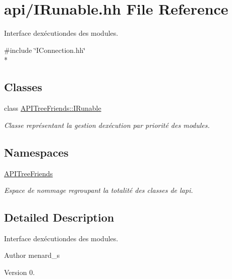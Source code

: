 \hypertarget{_i_runable_8hh}{}\section{api/\+I\+Runable.hh File Reference}
\label{_i_runable_8hh}


Interface d\textquotesingle{}exécutiondes des modules.  


{\ttfamily \#include \char`\"{}I\+Connection.\+hh\char`\"{}}\\*
\subsection*{Classes}
\begin{DoxyCompactItemize}
\item 
class \hyperlink{class_a_p_i_tree_friends_1_1_i_runable}{A\+P\+I\+Tree\+Friends\+::\+I\+Runable}
\begin{DoxyCompactList}\small\item\em Classe représentant la gestion d\textquotesingle{}exécution par priorité des modules. \end{DoxyCompactList}\end{DoxyCompactItemize}
\subsection*{Namespaces}
\begin{DoxyCompactItemize}
\item 
 \hyperlink{namespace_a_p_i_tree_friends}{A\+P\+I\+Tree\+Friends}
\begin{DoxyCompactList}\small\item\em Espace de nommage regroupant la totalité des classes de l\textquotesingle{}api. \end{DoxyCompactList}\end{DoxyCompactItemize}


\subsection{Detailed Description}
Interface d\textquotesingle{}exécutiondes des modules. 

\begin{DoxyAuthor}{Author}
menard\+\_\+s 
\end{DoxyAuthor}
\begin{DoxyVersion}{Version}
0. 
\end{DoxyVersion}
